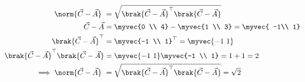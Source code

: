 \documentclass[11pt]{book}
\begin{document}
\begin{enumerate}[label=\thesection.\arabic*.,ref=\thesection.\theenumi]
  \begin{align}
 \norm{\vec{C}-\vec{A}}\ &=  \sqrt{\brak{\vec{C}-\vec{A}}^{\top}\brak{\vec{C}-\vec{A}}} \\
 \vec{C}-\vec{A} &= \myvec{0 \\ 4} - \myvec{1 \\ 3} = \myvec{ -1\\ 1} \\
 \brak{\vec{C}-\vec{A}}^{\top} &= {\myvec{-1 \\ 1}}^{\top} = \myvec{-1 \ 1} \\
\brak{\vec{C}-\vec{A}}^{\top}\brak{\vec{C}-\vec{A}} &= \myvec{-1 \ 1} \myvec{-1 \\ 1} = 1+1 = 2 \\  
 \implies \norm{\vec{C}-\vec{A}}\ &=\sqrt{\brak{\vec{C}-\vec{A}}^{\top}\brak{\vec{C}-\vec{A}}} = \sqrt{2}	 
\end{align}




\end{enumerate}
\end{document}
